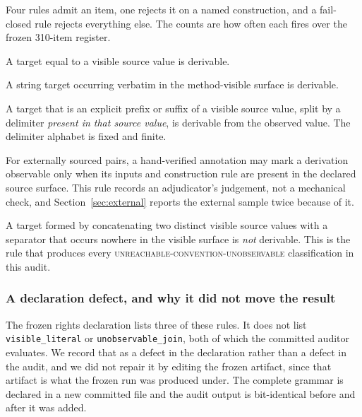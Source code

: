 \documentclass[11pt]{article}
\newcommand{\st}[1]{\textsc{\small #1}}
\begin{document}
Four rules admit an item, one rejects it on a named construction, and a
fail-closed rule rejects everything else. The counts are how often each fires
over the frozen 310-item register.

\begin{description}[style=nextline,leftmargin=1.2em]
  \item[identity (225)] A target equal to a visible source value is derivable.
  \item[visible\_literal (35)] A string target occurring verbatim in the
  method-visible surface is derivable.
  \item[visible\_split (0)] A target that is an explicit prefix or suffix of a
  visible source value, split by a delimiter \emph{present in that source
  value}, is derivable from the observed value. The delimiter alphabet is
  fixed and finite.
  \item[declared\_external\_derivation (0 here; 15 externally)] For externally
  sourced pairs, a hand-verified annotation may mark a derivation observable
  only when its inputs and construction rule are present in the declared source
  surface. This rule records an adjudicator's judgement, not a mechanical
  check, and Section~\ref{sec:external} reports the external sample twice
  because of it.
  \item[unobservable\_join (40)] A target formed by concatenating two distinct
  visible source values with a separator that occurs nowhere in the visible
  surface is \emph{not} derivable. This is the rule that produces every
  \st{unreachable-convention-unobservable} classification in this audit.
\end{description}

\subsubsection*{A declaration defect, and why it did not move the result}
\label{sec:ablation}

The frozen rights declaration lists three of these rules. It does not list
\texttt{visible\_literal} or \texttt{unobservable\_join}, both of which the
committed auditor evaluates. We record that as a defect in the declaration
rather than a defect in the audit, and we did not repair it by editing the
frozen artifact, since that artifact is what the frozen run was produced
under. The complete grammar is declared in a new committed file and the audit
output is bit-identical before and after it was added.
\end{document}
